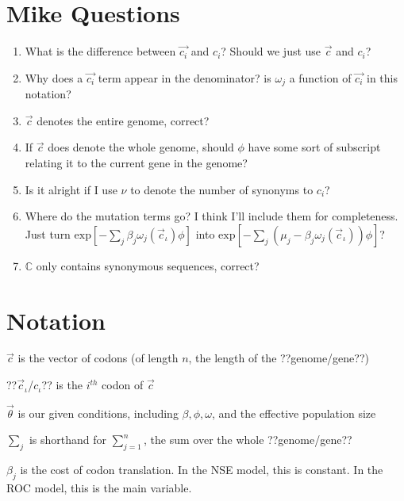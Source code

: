 
\usepackage{amssymb}


%
%




\section{Mike Questions}
\begin{enumerate}
\item What is the difference between $\vec{c_i}$ and $c_i$? Should we just use $\vec{c}$ and $c_i$?
\item Why does a $\vec{c_i}$ term appear in the denominator? is $\omega_j$ a function of $\vec{c_i}$ in this notation?
\item $\vec{c}$ denotes the entire genome, correct?
\item If $\vec{c}$ does denote the whole genome, should $\phi$ have some sort of subscript relating it to the current gene in the genome?
\item Is it alright if I use $\nu$ to denote the number of synonyms to $c_i$?
\item Where do the mutation terms go? I think I'll include them for completeness. Just turn
$\mbox{exp}\left[-\sum_j \beta_j \omega_j (\vec{c}_\iota) \phi \right]$
into
$\mbox{exp}\left[-\sum_j (\mu_j - \beta_j \omega_j (\vec{c}_\iota)) \phi \right]$?
\item $\mathbb{C}$ only contains synonymous sequences, correct?
\end{enumerate}


\section{Notation}

$\vec{c}$ is the vector of codons (of length $n$, the length of the ??genome/gene??)

??$\vec{c}_\iota$/$c_\iota$?? is the $i^{th}$ codon of $\vec{c}$

$\vec{\theta}$ is our given conditions, including $\beta, \phi, \omega$, and the effective population size

$\sum_j$ is shorthand for $\sum_{j=1}^n$, the sum over the whole ??genome/gene??

$\beta_j$ is the cost of codon translation. In the NSE model, this is constant. In the ROC model, this is the main variable.

